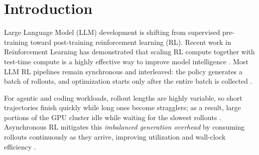 \section{Introduction}

Large Language Model (LLM) development is shifting from supervised pre-training toward post-training reinforcement learning (RL). Recent work in Reinforcement Learning has demonstrated that scaling RL compute together with test-time compute is a highly effective way to improve model intelligence \citep{deepseek2024r1, openaio1, cobbe2021training, lightman2023let}.
Most LLM RL pipelines remain synchronous and interleaved: the policy generates a batch of rollouts, and optimization starts only after the entire batch is collected \citep{ouyang2022training, rafailov2024direct}. 

For agentic and coding workloads, rollout lengths are highly variable, so short trajectories finish quickly while long ones become stragglers; as a result, large portions of the GPU cluster idle while waiting for the slowest rollouts \citep{shao2024deepseekv3, kwon2023efficient, yu2022orca}. Asynchronous RL mitigates this \textit{imbalanced generation overhead} by consuming rollouts continuously as they arrive, improving utilization and wall-clock efficiency \citep{mnih2016asynchronous, liang2018rllib, hoffman2020acme}.


